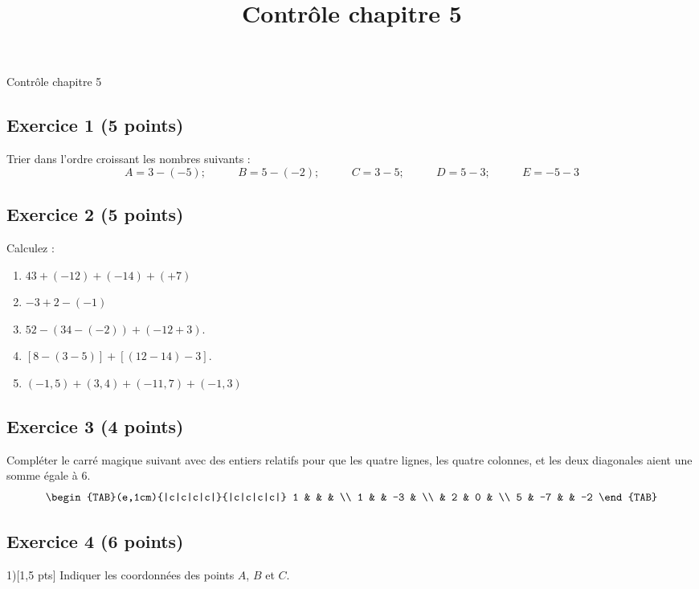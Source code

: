 \documentclass[14pt]{extreport}
\title{Contrôle chapitre 5}
\date{}
\theoremstyle{plain}
\begin{document}
\begin{center}{\Large Contrôle chapitre 5}\end{center}

 
 
\subsection*{Exercice 1 (5 points)}
 
 
 Trier dans l'ordre croissant les nombres suivants : 
 \[ A = 3 - (-5) ;\phantom{miaou}
  B = 5 - (-2) ;\phantom{miaou}
   C = 3 - 5 ; \phantom{miaou}
   D = 5 -3  ;\phantom{miaou}
   E = -5 - 3\]
\subsection*{Exercice 2 (5 points)}
 
 Calculez : \begin{enumerate}
 \item $43 + (-12) + (-14) + (+7) $
 \item $-3 + 2 - (-1)$
 \item $ 52 - (34 - (-2)) + (-12 + 3)$.
 \item $ [ 8 - (3 - 5)] + [(12-14) -3]$.
 \item $ (-1,5) + (3,4)  + (-11,7) + (-1,3)$ 
 \end{enumerate}

    
    \subsection*{Exercice 3 (4 points) }
    
Compléter le carré magique suivant avec des entiers relatifs pour que les quatre lignes, les quatre colonnes, 
et les deux diagonales aient une somme égale à $6$. 
\[
\begin{TAB}(e,1cm){|c|c|c|c|}{|c|c|c|c|}
    1 & & &  \\
    1 &  & -3 &  \\
      & 2 & 0 & \\
    5  & -7 &  & -2
\end{TAB}
\]


\subsection*{Exercice 4 (6 points)}

\begin{figure}[H]\center
{}
\end{figure}
1)[1,5 pts] Indiquer les coordonnées des points $A$, $B$ et $C$. 
\end{document}
